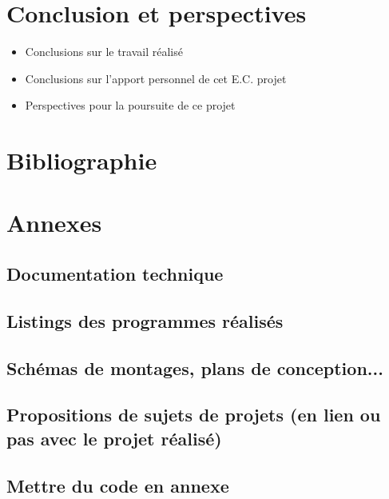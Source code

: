 \documentclass[a4paper, 12pt]{report} %
\begin{document}
\chapter*{Conclusion et perspectives}
\begin{itemize}
\item Conclusions sur le travail réalisé
\item Conclusions sur l'apport personnel de cet E.C. projet
\item Perspectives pour la poursuite de ce projet
\end{itemize}


\newpage

\renewcommand{\notesname}{} %
\chapter*{Bibliographie}
\makeatletter
\renewcommand{\enoteheading}{\par\vspace{1 em}}
\renewcommand{\theenmark}{\makebox[0.5 em][r]{\@theenmark}}
\renewcommand{\enoteformat}{\parindent = 2 em
  							\leftskip = 0.5 em
  							[\theenmark]\enspace\ignorespaces}							
\makeatother
\theendnotes


\newpage
\chapter*{Annexes}
\renewcommand{\thesection}{\Alph{section}}  %
\setcounter{section}{0} %

\section{Documentation technique}
\newpage

\section{Listings des programmes réalisés}
\newpage

\section{Schémas de montages, plans de conception...}
\newpage

\section{Propositions de sujets de projets (en lien ou pas avec le projet réalisé)}
\newpage

\section{Mettre du code en annexe}
\end{document}
